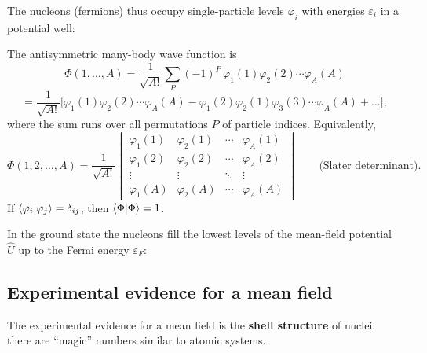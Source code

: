 \documentclass[11pt,a4paper]{article}
\newcommand{\op}[1]{\hat{#1}}
\begin{document}
The nucleons (fermions) thus occupy single-particle levels $\varphi_i$ with energies $\varepsilon_i$ in a potential well:
\begin{center}
\end{center}
The antisymmetric many-body wave function is
\[
\Phi(1,\dots,A)=\frac{1}{\sqrt{A!}}\sum_P(-1)^P\,\varphi_1(1)\varphi_2(2)\cdots\varphi_A(A)
\]
\[
=\frac{1}{\sqrt{A!}}\Big[\varphi_1(1)\varphi_2(2)\cdots\varphi_A(A)-\varphi_1(2)\varphi_2(1)\varphi_3(3)\cdots\varphi_A(A)+\dots\Big],
\]
where the sum runs over all permutations $P$ of particle indices. Equivalently,
\[
\Phi(1,2,\dots,A)=\frac{1}{\sqrt{A!}}
\begin{vmatrix}
\varphi_1(1)&\varphi_2(1)&\cdots&\varphi_A(1)\\
\varphi_1(2)&\varphi_2(2)&\cdots&\varphi_A(2)\\
\vdots&\vdots&\ddots&\vdots\\
\varphi_1(A)&\varphi_2(A)&\cdots&\varphi_A(A)
\end{vmatrix}
\qquad\text{(Slater determinant)}.
\]
If $\braket{\varphi_i|\varphi_j}=\delta_{ij}$, then $\braket{\Phi|\Phi}=1$.

In the ground state the nucleons fill the lowest levels of the mean-field potential $\op U$ up to the Fermi energy $\varepsilon_F$:
\begin{center}
\end{center}

\subsection{Experimental evidence for a mean field}
The experimental evidence for a mean field is the \textbf{shell structure} of nuclei: there are ``magic'' numbers similar to atomic systems.
\end{document}
